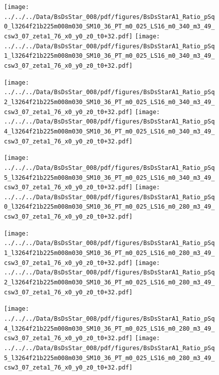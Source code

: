 \documentclass[a4paper,10pt]{article}
\begin{document}
\begin{figure}[p]
 \texttt{[image: ../../../Data/BsDsStar\_008/pdf/figures/BsDsStarA1\_Ratio\_pSq0\_l3264f21b225m008m030\_SM10\_36\_PT\_m0\_025\_LS16\_m0\_340\_m3\_49\_csw3\_07\_zeta1\_76\_x0\_y0\_z0\_t0+32.pdf]} 
 \texttt{[image: ../../../Data/BsDsStar\_008/pdf/figures/BsDsStarA1\_Ratio\_pSq1\_l3264f21b225m008m030\_SM10\_36\_PT\_m0\_025\_LS16\_m0\_340\_m3\_49\_csw3\_07\_zeta1\_76\_x0\_y0\_z0\_t0+32.pdf]} 
 \end{figure}
\begin{figure}[p]
 \texttt{[image: ../../../Data/BsDsStar\_008/pdf/figures/BsDsStarA1\_Ratio\_pSq2\_l3264f21b225m008m030\_SM10\_36\_PT\_m0\_025\_LS16\_m0\_340\_m3\_49\_csw3\_07\_zeta1\_76\_x0\_y0\_z0\_t0+32.pdf]} 
 \texttt{[image: ../../../Data/BsDsStar\_008/pdf/figures/BsDsStarA1\_Ratio\_pSq4\_l3264f21b225m008m030\_SM10\_36\_PT\_m0\_025\_LS16\_m0\_340\_m3\_49\_csw3\_07\_zeta1\_76\_x0\_y0\_z0\_t0+32.pdf]} 
 \end{figure}
\begin{figure}[p]
 \texttt{[image: ../../../Data/BsDsStar\_008/pdf/figures/BsDsStarA1\_Ratio\_pSq5\_l3264f21b225m008m030\_SM10\_36\_PT\_m0\_025\_LS16\_m0\_340\_m3\_49\_csw3\_07\_zeta1\_76\_x0\_y0\_z0\_t0+32.pdf]} 
 \texttt{[image: ../../../Data/BsDsStar\_008/pdf/figures/BsDsStarA1\_Ratio\_pSq0\_l3264f21b225m008m030\_SM10\_36\_PT\_m0\_025\_LS16\_m0\_280\_m3\_49\_csw3\_07\_zeta1\_76\_x0\_y0\_z0\_t0+32.pdf]} 
 \end{figure}
\clearpage
\begin{figure}[p]
 \texttt{[image: ../../../Data/BsDsStar\_008/pdf/figures/BsDsStarA1\_Ratio\_pSq1\_l3264f21b225m008m030\_SM10\_36\_PT\_m0\_025\_LS16\_m0\_280\_m3\_49\_csw3\_07\_zeta1\_76\_x0\_y0\_z0\_t0+32.pdf]} 
 \texttt{[image: ../../../Data/BsDsStar\_008/pdf/figures/BsDsStarA1\_Ratio\_pSq2\_l3264f21b225m008m030\_SM10\_36\_PT\_m0\_025\_LS16\_m0\_280\_m3\_49\_csw3\_07\_zeta1\_76\_x0\_y0\_z0\_t0+32.pdf]} 
 \end{figure}
\begin{figure}[p]
 \texttt{[image: ../../../Data/BsDsStar\_008/pdf/figures/BsDsStarA1\_Ratio\_pSq4\_l3264f21b225m008m030\_SM10\_36\_PT\_m0\_025\_LS16\_m0\_280\_m3\_49\_csw3\_07\_zeta1\_76\_x0\_y0\_z0\_t0+32.pdf]} 
 \texttt{[image: ../../../Data/BsDsStar\_008/pdf/figures/BsDsStarA1\_Ratio\_pSq5\_l3264f21b225m008m030\_SM10\_36\_PT\_m0\_025\_LS16\_m0\_280\_m3\_49\_csw3\_07\_zeta1\_76\_x0\_y0\_z0\_t0+32.pdf]} 
 \end{figure}
\clearpage
\end{document}
